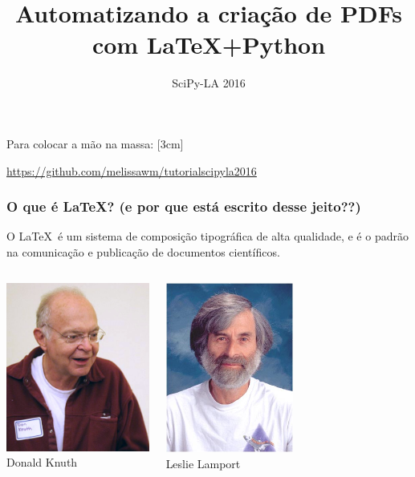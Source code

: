 \documentclass{beamer}
\title{\textcolor{europeanalonis}{Automatizando a criação de PDFs com \LaTeX+Python}} \author[M. Weber Mendonça]
\institute[UFSC]{\inst{1} Universidade Federal de Santa Catarina}
\date{SciPy-LA 2016}
\begin{document}
\begin{frame}
 \titlepage
\end{frame}
\begin{frame}
   \frametitle{}

   \begin{alertblock}{Para colocar a mão na massa:}
      \raisebox{1.5cm}[3cm]{%
      \begin{center}
         \url{https://github.com/melissawm/tutorialscipyla2016}
      \end{center}
    }
   \end{alertblock}
\end{frame}
\begin{frame}
   \frametitle{O que é \LaTeX? \small{(e por que está escrito desse jeito??)}}
   O \LaTeX\ é um sistema de composição tipográfica de alta qualidade, e é o padrão na comunicação e publicação de documentos científicos.
   \begin{columns}
      \column{5cm}
      \begin{center}
         \includegraphics[width=4.7cm]{img/knuth.jpg}\\
         Donald Knuth
      \end{center}
      \column{5cm}
      \begin{center}
         \includegraphics[width=4.2cm]{img/lamport.jpg}\\
         Leslie Lamport
      \end{center}
   \end{columns}
\end{frame}
\end{document}
